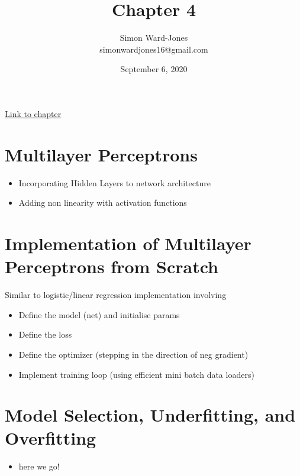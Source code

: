 \documentclass[12pt,notitlepage]{article}
\begin{document}


\title{\Large{\textbf{Chapter 4}}}
\date{September 6, 2020}
\author{Simon Ward-Jones\\simonwardjones16@gmail.com}

\maketitle
\href{https://d2l.ai/chapter_multilayer-perceptrons/index.html}{Link to chapter}

\section{Multilayer Perceptrons}
\begin{itemize}
    \item Incorporating Hidden Layers to network architecture
    \item Adding non linearity with activation functions
\end{itemize}

\section{Implementation of Multilayer Perceptrons from Scratch}
Similar to logistic/linear regression implementation involving
\begin{itemize}
    \item Define the model (net) and initialise params
    \item Define the loss
    \item Define the optimizer (stepping in the direction of neg gradient)
    \item Implement training loop (using efficient mini batch data loaders)
\end{itemize}


\section{Model Selection, Underfitting, and Overfitting}
\begin{itemize}
    \item here we go!
\end{itemize}

\vfill

\nocite{zhang2020dive}
\end{document}
